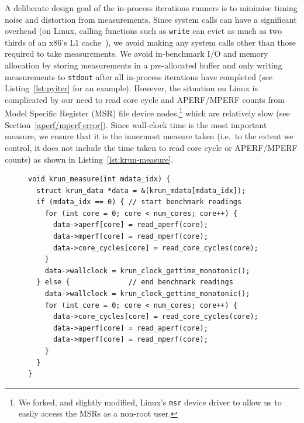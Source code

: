 \documentclass[preprint,numbers,10pt]{sigplanconf}
\begin{document}
A deliberate design goal of the in-process iterations runners is to minimise
timing noise and distortion from measurements. Since system calls can have a
significant overhead (on Linux, calling functions such as \texttt{write} can
evict as much as two thirds of an x86's L1 cache~\cite{soares10flexsc}), we
avoid making any system calls other than those required to take measurements. We
avoid in-benchmark I/O and memory allocation by storing measurements in a
pre-allocated buffer and only writing measurements to \texttt{stdout} after all
in-process iterations have completed (see Listing~\ref{lst:pyiter} for an
example). However, the situation on Linux is complicated by our need to read
core cycle and APERF/MPERF counts from Model Specific Register (MSR) file device
nodes,\footnote{We forked, and slightly modified, Linux's \texttt{msr} device
driver to allow us to easily access the MSRs as a non-root user.} which are relatively
slow (see Section~\ref{aperf/mperf error}). Since wall-clock time
is the most important measure, we ensure that it is the innermost measure taken
(i.e.~to the extent we control, it does not include the time taken to read
core cycle or APERF/MPERF counts) as shown in Listing~\ref{lst:krun-measure}.

\begin{figure}[t]
\begin{lstlisting}[label=lst:krun-measure, xleftmargin=0cm,
        caption={%
\texttt{krun\_measure}: Measuring before (the \texttt{if}'s true branch) and
after (its false branch) a benchmark. Since
wall-clock time is the most important measure, it is innermost; since
the APERF/MPERF counters are a sanity check, they are outermost. Note that
the APERF/MPERF counters must be read in the same order before
and after a benchmark.}]
void krun_measure(int mdata_idx) {
  struct krun_data *data = &(krun_mdata[mdata_idx]);
  if (mdata_idx == 0) { // start benchmark readings
    for (int core = 0; core < num_cores; core++) {
      data->aperf[core] = read_aperf(core);
      data->mperf[core] = read_mperf(core);
      data->core_cycles[core] = read_core_cycles(core);
    }
    data->wallclock = krun_clock_gettime_monotonic();
  } else {              // end benchmark readings
    data->wallclock = krun_clock_gettime_monotonic();
    for (int core = 0; core < num_cores; core++) {
      data->core_cycles[core] = read_core_cycles(core);
      data->aperf[core] = read_aperf(core);
      data->mperf[core] = read_mperf(core);
    }
  }
}
\end{lstlisting}
\vspace{-.75cm}
\end{figure}
\end{document}
